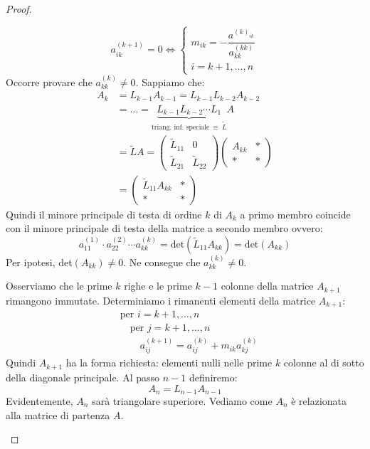 \documentclass[12pt]{report}
\begin{document}
\begin{proof}
\begin{enumerate}
\[		a^{(k+1)}_{ik} = 0 \iff \begin{cases}
			m_{ik} = -\dfrac{a^{(k)_{ik}}}{a^{(kk)}_{kk}} \\
			i = k+1, \dots, n
		\end{cases}
		\]
		Occorre provare che $a^{(k)}_{kk} \neq 0$. Sappiamo che:
		\begin{align*}
		A_k &= L_{k-1}A_{k-1} = L_{k-1}L_{k-2}A_{k-2} \\
		&= \dots = \underset{\text{triang. inf. speciale}\ \equiv\ \tilde{L}}{\underbrace{L_{k-1}L_{k-2} \cdots L_1}}A \\
		&= \tilde{L}A = \begin{pmatrix}
			\tilde{L}_{11} & 0 \\
			\tilde{L}_{21} & \tilde{L}_{22}
		\end{pmatrix}\begin{pmatrix}
			A_{kk} & * \\
			* & *
		\end{pmatrix} \\
		&= \begin{pmatrix}
			\tilde{L}_{11}A_{kk} & * \\
			* & *
		\end{pmatrix}
		\end{align*}
		Quindi il minore principale di testa di ordine $k$ di $A_k$ a primo membro coincide con il minore principale di testa della matrice a secondo membro ovvero:
		\[
		a^{(1)}_{11} \cdot a^{(2)}_{22} \cdots a^{(k)}_{kk} = \text{det}(\tilde{L}_{11}A_{kk}) = \text{det}(A_{kk})
		\]
		Per ipotesi, det$(A_{kk}) \neq 0$. Ne consegue che $a^{(k)}_{kk} \neq 0$.

		Osserviamo che le prime $k$ righe e le prime $k-1$ colonne della matrice $A_{k+1}$ rimangono immutate. Determiniamo i rimanenti elementi della matrice $A_{k+1}$:
		\begin{align*}
			&\text{per } i = k + 1, \dots, n \\
			&\quad \text{per } j = k+1, \dots, n \\
			&\quad \quad a^{(k+1)}_{ij} = a^{(k)}_{ij} + m_{ik}a^{(k)}_{kj}
		\end{align*}
		Quindi $A_{k+1}$ ha la forma richiesta: elementi nulli nelle prime $k$ colonne al di sotto della diagonale principale. Al passo $n-1$ definiremo:
		\[
		A_n = L_{n-1}A_{n-1}
		\]
		Evidentemente, $A_n$ sarà triangolare superiore. Vediamo come $A_n$ è relazionata alla matrice di partenza $A$.


\end{enumerate}
\end{proof}
\end{document}
